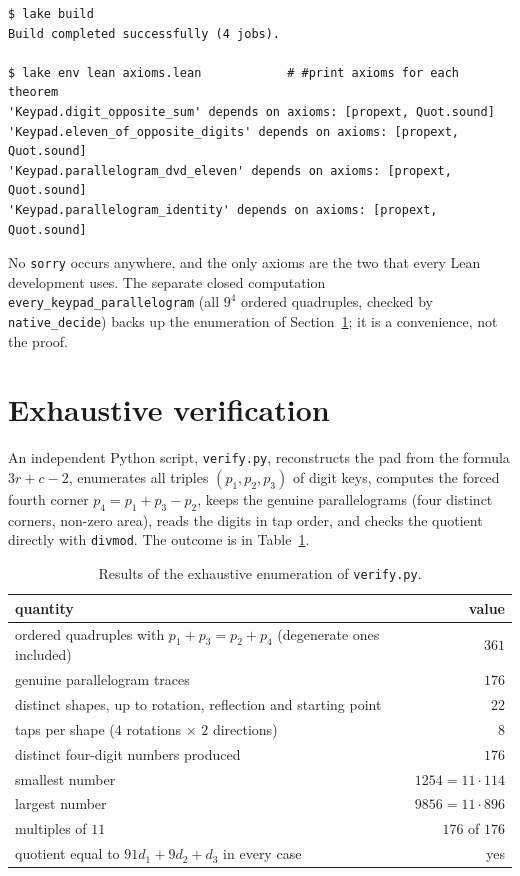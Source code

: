 \documentclass[11pt,a4paper]{article}
\theoremstyle{definition}
\theoremstyle{remark}
\newcommand{\code}[1]{\texttt{#1}}
\begin{document}
\begin{verbatim}
$ lake build
Build completed successfully (4 jobs).

$ lake env lean axioms.lean            # #print axioms for each theorem
'Keypad.digit_opposite_sum' depends on axioms: [propext, Quot.sound]
'Keypad.eleven_of_opposite_digits' depends on axioms: [propext, Quot.sound]
'Keypad.parallelogram_dvd_eleven' depends on axioms: [propext, Quot.sound]
'Keypad.parallelogram_identity' depends on axioms: [propext, Quot.sound]
\end{verbatim}

No \code{sorry} occurs anywhere, and the only axioms are the two that every Lean
development uses. The separate closed computation
\code{every\_keypad\_parallelogram} (all $9^4$ ordered quadruples, checked by
\code{native\_decide}) backs up the enumeration of Section~\ref{sec:verify}; it is a
convenience, not the proof.

\section{Exhaustive verification}
\label{sec:verify}

An independent Python script, \code{verify.py}, reconstructs the pad from the formula
$3r+c-2$, enumerates all triples $(p_1,p_2,p_3)$ of digit keys, computes the forced
fourth corner $p_4=p_1+p_3-p_2$, keeps the genuine parallelograms (four distinct
corners, non-zero area), reads the digits in tap order, and checks the quotient
directly with \code{divmod}. The outcome is in Table~\ref{tab:counts}.

\begin{table}[htbp]
\centering
\caption{Results of the exhaustive enumeration of \code{verify.py}.}
\label{tab:counts}
\small
\begin{tabular}{@{}lr@{}}
\toprule
quantity & value\\
\midrule
ordered quadruples with $p_1+p_3=p_2+p_4$ (degenerate ones included) & $361$\\
genuine parallelogram traces & $176$\\
distinct shapes, up to rotation, reflection and starting point & $22$\\
taps per shape ($4$ rotations $\times$ $2$ directions) & $8$\\
distinct four-digit numbers produced & $176$\\
smallest number & $1254=11\cdot 114$\\
largest number & $9856=11\cdot 896$\\
multiples of $11$ & $176$ of $176$\\
quotient equal to $91d_1+9d_2+d_3$ in every case & yes\\
\bottomrule
\end{tabular}
\end{table}
\end{document}
